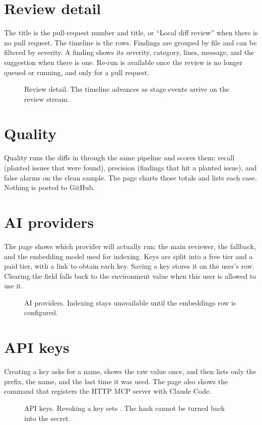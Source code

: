 \section{Review detail}

The title is the pull-request number and title, or ``Local diff review'' when there is no pull request. The timeline is the  rows. Findings are grouped by file and can be filtered by severity. A finding shows its severity, category, lines, message, and the suggestion when there is one. Re-run is available once the review is no longer queued or running, and only for a pull request.

\begin{figure}[H]
  \centering
  \resizebox{\linewidth}{!}{}
  \caption{Review detail. The timeline advances as stage events arrive on the review stream.}
  \label{fig:mock-review}
\end{figure}

\section{Quality}

Quality runs the diffs in  through the same pipeline and scores them: recall (planted issues that were found), precision (findings that hit a planted issue), and false alarms on the clean sample. The page charts those totals and lists each case. Nothing is posted to GitHub.

\section{AI providers}

The page shows which provider will actually run: the main reviewer, the fallback, and the embedding model used for indexing. Keys are split into a free tier and a paid tier, with a link to obtain each key. Saving a key stores it on the user's  row. Clearing the field falls back to the environment value when this user is allowed to use it.

\begin{figure}[H]
  \centering
  \resizebox{\linewidth}{!}{}
  \caption{AI providers. Indexing stays unavailable until the embeddings row is configured.}
  \label{fig:mock-providers}
\end{figure}

\section{API keys}

Creating a key asks for a name, shows the raw  value once, and then lists only the prefix, the name, and the last time it was used. The page also shows the command that registers the HTTP MCP server with Claude Code.

\begin{figure}[H]
  \centering
  \resizebox{\linewidth}{!}{}
  \caption{API keys. Revoking a key sets . The hash cannot be turned back into the secret.}
  \label{fig:mock-keys}
\end{figure}
